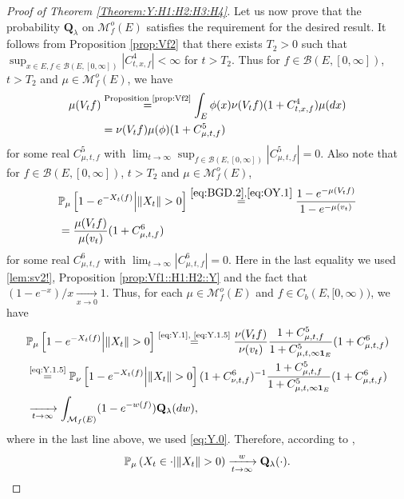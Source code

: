 \documentclass[12pt,a4paper]{amsart}
\numberwithin{equation}{section}
\theoremstyle{plain}
\theoremstyle{definition}
\theoremstyle{remark}
\begin{document}
\begin{proof}[Proof of Theorem \ref{Theorem:Y:H1:H2:H3:H4}]
	Let us now prove that the probability $\mathbf Q_\lambda$ on $\mathcal M_f^o(E)$
	satisfies the requirement for the desired result.
	It follows from Proposition \ref{prop:Vf2} that there exists $T_2 >0$ such that
	$\sup_{x\in E, f \in \mathcal B(E,[0,\infty])} |C^4_{t,x,f}|< \infty$ for $t>T_2$.
	Thus for $f \in \mathcal B(E,[0,\infty])$, $t>T_2$ and $\mu \in \mathcal M_f^o(E)$, we have
\begin{align}
	\mu(V_tf)
		& \overset{\text{Proposition \ref{prop:Vf2}}}=
		\int_E  \phi(x) \nu (V_tf) (1+ C^4_{t,x,f})\mu(dx)
	\\ \label{eq:Y.1}
		& = \nu(V_tf) \mu(\phi)(1+ C^5_{\mu,t,f})
\end{align}
		for some real $C^{5}_{\mu,t,f}$ with $\lim_{t\to \infty} \sup_{f \in \mathcal B(E,[0,\infty])} |C^{5}_{\mu,t,f}| = 0$.
		Also note that for $f\in \mathcal B(E,[0,\infty])$,
	$t > T_2$ and $\mu \in \mathcal M_f^o(E)$,
\begin{align}
	&\mathbb P_\mu \left[1 - e^{-X_t(f)} \middle|\|X_t\|>0\right]
	\overset{\eqref{eq:BGD.2},\eqref{eq:OY.1}}= \frac{1 - e^{- \mu(V_tf)}} {1 - e^{-\mu(v_t)}}\\ \label{eq:Y.1.5}
    & = \frac{ \mu(V_t f) }{ \mu(v_t) }
	(1+C^{6}_{\mu,t,f})
\end{align}
	for some real $C^{6}_{\mu,t,f}$ with $\lim_{t\to \infty} |C^{6}_{\mu,t,f}| = 0$.
	Here in the last equality we used \eqref{lem:sv2!}, Proposition \ref{prop:Vf1::H1:H2::Y} and the fact that $(1-e^{-x})/x \xrightarrow[x\to 0]{}1$.
	Thus, for each $\mu \in \mathcal M^o_f(E)$ and $f\in C_b(E,[0,\infty))$, we have
\begin{align}
	&\mathbb P_\mu \left[1 - e^{-X_t(f)} \middle|\|X_t\|>0\right]
	\overset{\text{\eqref{eq:Y.1}, \eqref{eq:Y.1.5}}}= \frac{ \nu(V_tf) }{ \nu(v_t) }
	\frac{1+C^5_{\mu,t,f}}{1+C^5_{\mu, t,\infty \mathbf 1_E}}(1+ C^6_{\mu,t,f})
	\\& \overset{\text{\eqref{eq:Y.1.5}}}= \mathbb P_\nu \left[1 - e^{-X_t(f)} \middle| \|X_t\|>0\right]
(1+C^6_{\nu, t,f})^{-1}  \frac{1+C^5_{\mu,t,f}}{1+C^5_{\mu,  t,\infty \mathbf 1_E}}(1+ C^6_{\mu,t,f})
	\\&\xrightarrow[t\to \infty]{} \int_{\mathcal M_f(E)}(1-e^{-w(f)}) \mathbf Q_\lambda(dw),
\end{align}
	where in the last line above, we used \eqref{eq:Y.0}.
	Therefore, according to \cite[Theorem 1.18]{Li2011MeasureValued},
	\[\mathbb P_\mu\left(X_t \in \cdot \middle| \|X_t\|>0\right)
	\xrightarrow[t\to \infty]{w}
	\mathbf Q_\lambda(\cdot). \qedhere\]
\end{proof}
\end{document}
